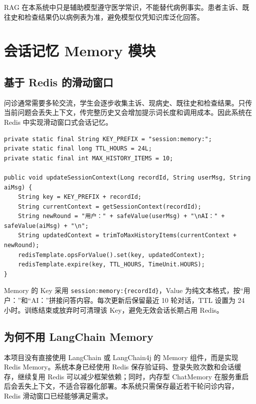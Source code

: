 RAG 在本系统中只是辅助模型遵守医学常识，不能替代病例事实。患者主诉、既往史和检查结果仍以病例表为准，避免模型仅凭知识库泛化回答。

\section{会话记忆 Memory 模块}

\subsection{基于 Redis 的滑动窗口}

问诊通常需要多轮交流，学生会逐步收集主诉、现病史、既往史和检查结果。只传当前问题会丢失上下文，传完整历史又会增加提示词长度和调用成本。因此系统在 Redis 中实现滑动窗口式会话记忆。

\begin{lstlisting}[style=java, caption={ConversationMemoryService 滑动窗口（节选）}, label={lst:memory}]
private static final String KEY_PREFIX = "session:memory:";
private static final long TTL_HOURS = 24L;
private static final int MAX_HISTORY_ITEMS = 10;

public void updateSessionContext(Long recordId, String userMsg, String aiMsg) {
    String key = KEY_PREFIX + recordId;
    String currentContext = getSessionContext(recordId);
    String newRound = "用户：" + safeValue(userMsg) + "\nAI：" + safeValue(aiMsg) + "\n";
    String updatedContext = trimToMaxHistoryItems(currentContext + newRound);
    redisTemplate.opsForValue().set(key, updatedContext);
    redisTemplate.expire(key, TTL_HOURS, TimeUnit.HOURS);
}
\end{lstlisting}

Memory 的 Key 采用 \texttt{session:memory:\{recordId\}}，Value 为纯文本格式，按“用户：”和“AI：”拼接问答内容。每次更新后保留最近 10 轮对话，TTL 设置为 24 小时。训练结束或放弃时可清理该 Key，避免无效会话长期占用 Redis。

\subsection{为何不用 LangChain Memory}

本项目没有直接使用 LangChain 或 LangChain4j 的 Memory 组件，而是实现 Redis Memory。系统本身已经使用 Redis 保存验证码、登录失败次数和会话缓存，继续复用 Redis 可以减少框架依赖；同时，内存型 ChatMemory 在服务重启后会丢失上下文，不适合容器化部署。本系统只需保存最近若干轮问诊内容，Redis 滑动窗口已经能够满足需求。

